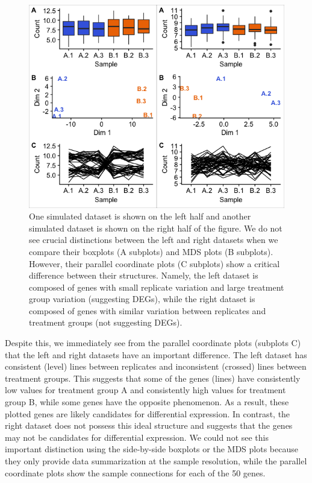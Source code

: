 \documentclass[11pt,a4paper,oldfontcommands,openany]{memoir}
\numberwithin{equation}{section} %
\begin{document}
\begin{figure}[!tpb]
\begin{framed}
\centerline{\includegraphics[width=\columnwidth]{MakeFigures/simulatedData.jpg}}
\end{framed}
\caption{One simulated dataset is shown on the left half and another simulated dataset is shown on the right half of the figure. We do not see crucial distinctions between the left and right datasets when we compare their boxplots (A subplots) and MDS plots (B subplots). However, their parallel coordinate plots (C subplots) show a critical difference between their structures. Namely, the left dataset is composed of genes with small replicate variation and large treatment group variation (suggesting DEGs), while the right dataset is composed of genes with similar variation between replicates and treatment groups (not suggesting DEGs). 
\label{simulatedData}}
\end{figure}

Despite this, we immediately see from the parallel coordinate plots (subplots C) that the left and right datasets have an important difference. The left dataset has consistent (level) lines between replicates and inconsistent (crossed) lines between treatment groups. This suggests that some of the genes (lines) have consistently low values for treatment group A and consistently high values for treatment group B, while some genes have the opposite phenomenon. As a result, these plotted genes are likely candidates for differential expression. In contrast, the right dataset does not possess this ideal structure and suggests that the genes may not be candidates for differential expression. We could not see this important distinction using the side-by-side boxplots or the MDS plots because they only provide data summarization at the sample resolution, while the parallel coordinate plots show the sample connections for each of the 50 genes.
\end{document}
